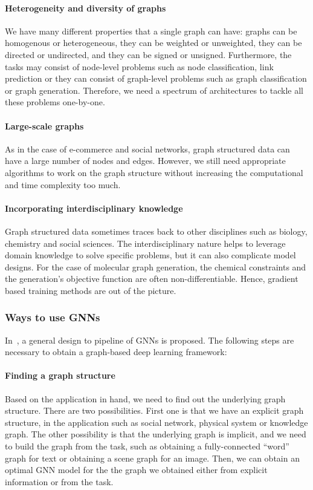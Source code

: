 \paragraph{Heterogeneity and diversity of graphs}
We have many different properties that a single graph can have: graphs can be homogenous or heterogeneous, they can be weighted or unweighted, they can be directed or undirected, and they can be signed or unsigned. Furthermore, the tasks may consist of node-level problems such as node classification, link prediction or they can consist of graph-level problems such as graph classification or graph generation. Therefore, we need a spectrum of architectures to tackle all these problems one-by-one.

\paragraph{Large-scale graphs}
As in the case of e-commerce and social networks, graph structured data can have a large number of nodes and edges. However, we still need appropriate algorithms to work on the graph structure without increasing the computational and time complexity too much.

\paragraph{Incorporating interdisciplinary knowledge}
Graph structured data sometimes traces back to other disciplines such as biology, chemistry and social sciences. The interdisciplinary nature helps to leverage domain knowledge to solve specific problems, but it can also complicate model designs. For the case of molecular graph generation, the chemical constraints and the generation's objective function are often non-differentiable. Hence, gradient based training methods are out of the picture.

\subsubsection{Ways to use GNNs}
In~\autocite{zhou20gnn}, a general design to pipeline of GNNs is proposed. The following steps are necessary to obtain a graph-based deep learning framework:
\paragraph{Finding a graph structure}
Based on the application in hand, we need to find out the underlying graph structure. There are two possibilities. First one is that we have an explicit graph structure, in the application such as social network, physical system or knowledge graph. The other possibility is that the underlying graph is implicit, and we need to build the graph from the task, such as obtaining a fully-connected ``word'' graph for text or obtaining a scene graph for an image. Then, we can obtain an optimal GNN model for the the graph we obtained either from explicit information or from the task.

